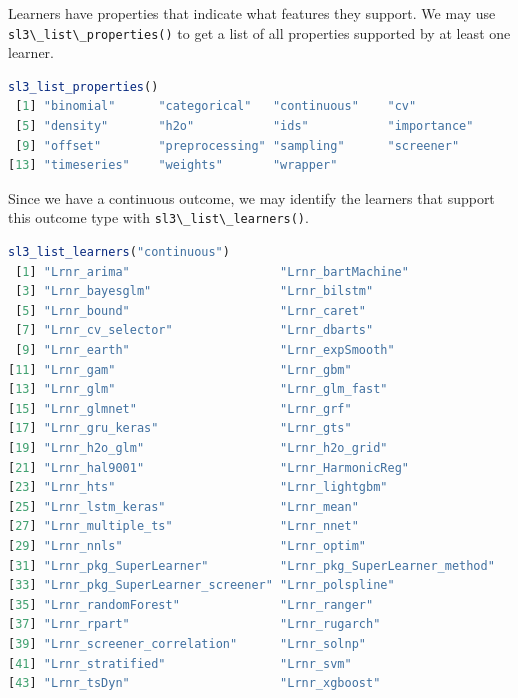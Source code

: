\documentclass[
  12pt, krantz2,
]{krantz}
\newcommand{\passthrough}[1]{#1}
\newcommand{\1}{\mathbbm{1}}
\theoremstyle{definition}
\theoremstyle{definition}
\theoremstyle{definition}
\theoremstyle{definition}
\theoremstyle{remark}
\begin{document}
Learners have properties that indicate what features they support. We may use
\passthrough{\lstinline!sl3\_list\_properties()!} to get a list of all properties supported by at least
one learner.

\begin{lstlisting}[language=R]
sl3_list_properties()
 [1] "binomial"      "categorical"   "continuous"    "cv"           
 [5] "density"       "h2o"           "ids"           "importance"   
 [9] "offset"        "preprocessing" "sampling"      "screener"     
[13] "timeseries"    "weights"       "wrapper"      
\end{lstlisting}

Since we have a continuous outcome, we may identify the learners that support
this outcome type with \passthrough{\lstinline!sl3\_list\_learners()!}.

\begin{lstlisting}[language=R]
sl3_list_learners("continuous")
 [1] "Lrnr_arima"                     "Lrnr_bartMachine"              
 [3] "Lrnr_bayesglm"                  "Lrnr_bilstm"                   
 [5] "Lrnr_bound"                     "Lrnr_caret"                    
 [7] "Lrnr_cv_selector"               "Lrnr_dbarts"                   
 [9] "Lrnr_earth"                     "Lrnr_expSmooth"                
[11] "Lrnr_gam"                       "Lrnr_gbm"                      
[13] "Lrnr_glm"                       "Lrnr_glm_fast"                 
[15] "Lrnr_glmnet"                    "Lrnr_grf"                      
[17] "Lrnr_gru_keras"                 "Lrnr_gts"                      
[19] "Lrnr_h2o_glm"                   "Lrnr_h2o_grid"                 
[21] "Lrnr_hal9001"                   "Lrnr_HarmonicReg"              
[23] "Lrnr_hts"                       "Lrnr_lightgbm"                 
[25] "Lrnr_lstm_keras"                "Lrnr_mean"                     
[27] "Lrnr_multiple_ts"               "Lrnr_nnet"                     
[29] "Lrnr_nnls"                      "Lrnr_optim"                    
[31] "Lrnr_pkg_SuperLearner"          "Lrnr_pkg_SuperLearner_method"  
[33] "Lrnr_pkg_SuperLearner_screener" "Lrnr_polspline"                
[35] "Lrnr_randomForest"              "Lrnr_ranger"                   
[37] "Lrnr_rpart"                     "Lrnr_rugarch"                  
[39] "Lrnr_screener_correlation"      "Lrnr_solnp"                    
[41] "Lrnr_stratified"                "Lrnr_svm"                      
[43] "Lrnr_tsDyn"                     "Lrnr_xgboost"                  
\end{lstlisting}
\end{document}
